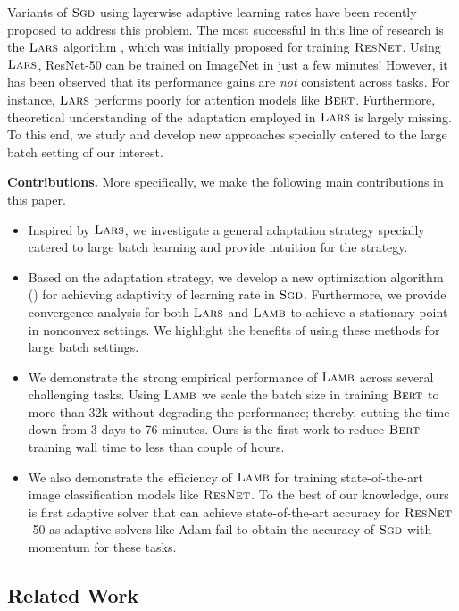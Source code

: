 Variants of $\textsc{Sgd}$ using layerwise adaptive learning rates have been recently proposed to address this problem. The most successful in this line of research is the $\textsc{Lars}$ algorithm \citep{you2017scaling}, which was initially proposed for training $\textsc{ResNet}$. Using $\textsc{Lars}$, ResNet-50 can be trained on ImageNet in just a few minutes! However, it has been observed that its performance gains are \emph{not} consistent across tasks. For instance, $\textsc{Lars}$ performs poorly for attention models like $\textsc{Bert}$. Furthermore, theoretical understanding of the adaptation employed in $\textsc{Lars}$ is largely missing. To this end, we study and develop new approaches specially catered to the large batch setting of our interest.

{\bf Contributions.} More specifically, we make the following main contributions in this paper.

\begin{itemize}
\item Inspired by $\textsc{Lars}$, we investigate a general adaptation strategy specially catered to large batch learning and provide intuition for the strategy.
\item Based on the adaptation strategy, we develop a new optimization algorithm (\lamb) for achieving adaptivity of learning rate in $\textsc{Sgd}$. Furthermore, we provide convergence analysis for both $\textsc{Lars}$ and $\textsc{Lamb}$ to achieve a stationary point in nonconvex settings. We highlight the benefits of using these methods for large batch settings.
\item We demonstrate the strong empirical performance of $\textsc{Lamb}$ across several challenging tasks. Using $\textsc{Lamb}$ we scale the batch size in training $\textsc{Bert}$ to more than 32k without degrading the performance; thereby, cutting the time down from 3 days to 76 minutes. Ours is the first work to reduce $\textsc{Bert}$ training wall time to less than couple of hours.
\item We also demonstrate the efficiency of $\textsc{Lamb}$ for training state-of-the-art image classification models like $\textsc{ResNet}$. To the best of our knowledge, ours is first adaptive solver that can achieve state-of-the-art accuracy for $\textsc{ResNet}$-50 as adaptive solvers like Adam fail to obtain the accuracy of $\textsc{Sgd}$ with momentum for these tasks.
\end{itemize}

\subsection{Related Work}

